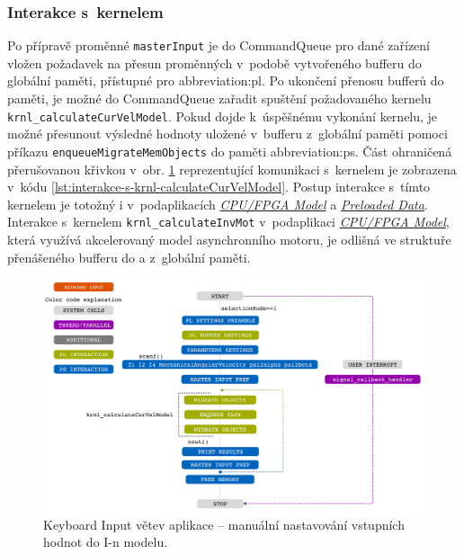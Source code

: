 \documentclass[a4paper, twoside, 11pt]{article}
\begin{document}
			\subsubsection{Interakce s~kernelem}
			Po přípravě proměnné \texttt{masterInput} je do CommandQueue pro dané zařízení vložen požadavek na přesun proměnných v~podobě vytvořeného bufferu do globální paměti, přístupné pro \gls{abbreviation:pl}. Po ukončení přenosu bufferů do paměti, je možné do CommandQueue zařadit spuštění požadovaného kernelu \texttt{krnl\_calculateCurVelModel}. Pokud dojde k~úspěšnému vykonání kernelu, je možné přesunout výsledné hodnoty uložené v~bufferu z~globální paměti pomoci příkazu \texttt{enqueueMigrateMemObjects} do paměti \gls{abbreviation:ps}. Část ohraničená přerušovanou křivkou v~obr. \ref{fig:keyboard-input} reprezentující komunikaci s~kernelem je zobrazena v~kódu \ref{lst:interakce-s-krnl-calculateCurVelModel}. Postup interakce s~tímto kernelem je totožný i v~podaplikacích \hyperref[subsec:cpu-fpga]{\textit{CPU/FPGA Model}} a \hyperref[subsec:preloaded-data]{\textit{Preloaded Data}}. Interakce s~kernelem \texttt{krnl\_calculateInvMot} v~podaplikaci \hyperref[subsec:cpu-fpga]{\textit{CPU/FPGA Model}}, která využívá akcelerovaný model asynchronního motoru, je odlišná ve struktuře přenášeného bufferu do a z~globální paměti.\par

 		\begin{figure}[htbp!]
			\centering
			\includegraphics[width=1\textwidth]{src/pdf/keyboard-input.pdf}
			\caption{Keyboard Input větev aplikace – manuální nastavování vstupních hodnot do I-n modelu.}
			\label{fig:keyboard-input}
		\end{figure}
\end{document}
